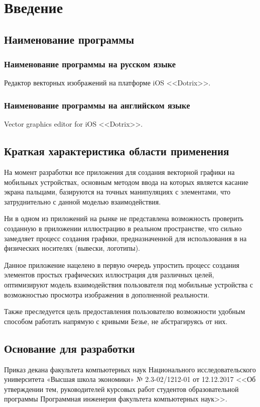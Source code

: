 \section{Введение}

\subsection{Наименование программы}

\subsubsection{Наименование программы на русском языке}

Редактор векторных изображений на платформе iOS <<Dotrix>>.

\subsubsection{Наименование программы на английском языке}

Vector graphics editor for iOS  <<Dotrix>>.

\subsection{Краткая характеристика области применения}

На момент разработки все приложения для создания векторной графики на мобильных устройствах, основным методом ввода на которых является касание экрана пальцами, базируются на точных манипуляциях с элементами, что затруднительно с данной моделью взаимодействия. 

Ни в одном из приложений на рынке не представлена возможность проверить созданную в приложении иллюстрацию в реальном пространстве, что сильно замедляет процесс создания графики, предназначенной для использования в на физических носителях (вывески, логотипы). 

Данное приложение нацелено в первую очередь упростить процесс создания элементов простых графических иллюстрация для различных целей, оптимизируют модель взаимодействия пользователя под мобильные устройства с возможностью просмотра изображения в дополненной реальности.

Также преследуется цель предоставления пользователю возможности удобным способом работать напрямую с кривыми Безье, не абстрагируясь от них.

\subsection{Основание для разработки}

Приказ декана факультета компьютерных наук Национального исследовательского университета «Высшая школа экономики» № 2.3-02/1212-01 от 12.12.2017 <<Об утверждении тем, руководителей курсовых работ студентов образовательной программы Программная инженерия факультета компьютерных наук>>.
